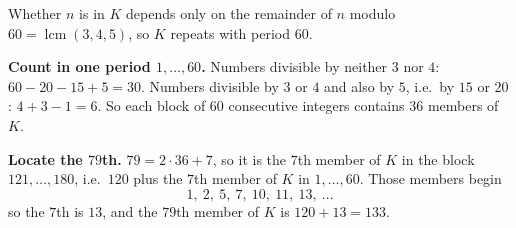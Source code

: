 Whether $n$ is in $K$ depends only on the remainder of $n$ modulo $60=\operatorname{lcm}(3,4,5)$, so $K$ repeats with period $60$.

\textbf{Count in one period $1,\dots,60$.} Numbers divisible by neither $3$ nor $4$: $60-20-15+5=30$. Numbers divisible by $3$ or $4$ and also by $5$, i.e.\ by $15$ or $20$: $4+3-1=6$. So each block of $60$ consecutive integers contains $36$ members of $K$.

\textbf{Locate the $79$th.} $79=2\cdot36+7$, so it is the $7$th member of $K$ in the block $121,\dots,180$, i.e.\ $120$ plus the $7$th member of $K$ in $1,\dots,60$. Those members begin
\[
1,\ 2,\ 5,\ 7,\ 10,\ 11,\ 13,\ \dots
\]
so the $7$th is $13$, and the $79$th member of $K$ is $120+13=\boxed{133}$.
